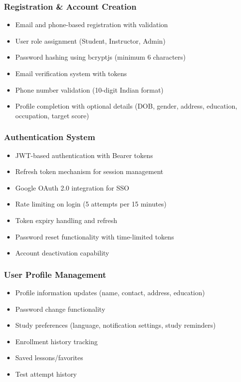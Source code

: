 \documentclass{article}
\begin{document}
\subsubsection{Registration \& Account Creation}
\begin{itemize}
    \item Email and phone-based registration with validation
    \item User role assignment (Student, Instructor, Admin)
    \item Password hashing using bcryptjs (minimum 6 characters)
    \item Email verification system with tokens
    \item Phone number validation (10-digit Indian format)
    \item Profile completion with optional details (DOB, gender, address, education, occupation, target score)
\end{itemize}

\subsubsection{Authentication System}
\begin{itemize}
    \item JWT-based authentication with Bearer tokens
    \item Refresh token mechanism for session management
    \item Google OAuth 2.0 integration for SSO
    \item Rate limiting on login (5 attempts per 15 minutes)
    \item Token expiry handling and refresh
    \item Password reset functionality with time-limited tokens
    \item Account deactivation capability
\end{itemize}

\subsubsection{User Profile Management}
\begin{itemize}
    \item Profile information updates (name, contact, address, education)
    \item Password change functionality
    \item Study preferences (language, notification settings, study reminders)
    \item Enrollment history tracking
    \item Saved lessons/favorites
    \item Test attempt history
\end{itemize}
\end{document}
